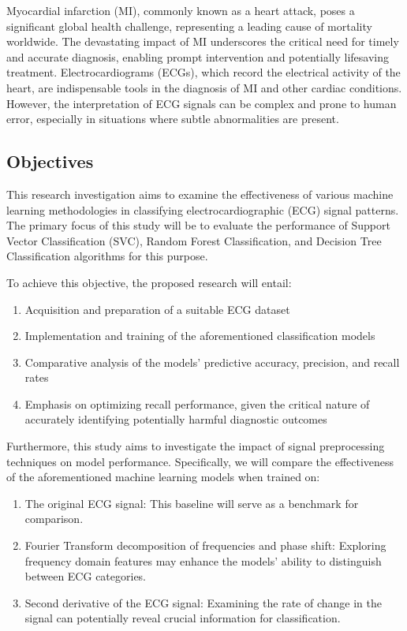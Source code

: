 \documentclass[runningheads]{llncs}
\begin{document}
Myocardial infarction (MI), commonly known as a heart attack, poses a significant global health challenge, representing a leading cause of mortality worldwide. The devastating impact of MI underscores the critical need for timely and accurate diagnosis, enabling prompt intervention and potentially lifesaving treatment. Electrocardiograms (ECGs), which record the electrical activity of the heart, are indispensable tools in the diagnosis of MI and other cardiac conditions. However, the interpretation of ECG signals can be complex and prone to human error, especially in situations where subtle abnormalities are present.


\subsection{Objectives}

This research investigation aims to examine the effectiveness of various machine learning methodologies in classifying electrocardiographic (ECG) signal patterns. The primary focus of this study will be to evaluate the performance of Support Vector Classification (SVC), Random Forest Classification, and Decision Tree Classification algorithms for this purpose.

To achieve this objective, the proposed research will entail:
\begin{enumerate}
    \item Acquisition and preparation of a suitable ECG dataset
    \item Implementation and training of the aforementioned classification models
    \item Comparative analysis of the models' predictive accuracy, precision, and recall rates
    \item Emphasis on optimizing recall performance, given the critical nature of accurately identifying potentially harmful diagnostic outcomes
\end{enumerate}

Furthermore, this study aims to investigate the impact of signal preprocessing techniques on model performance. Specifically, we will compare the effectiveness of the aforementioned machine learning models when trained on:

\begin{enumerate}
    \item The original ECG signal: This baseline will serve as a benchmark for comparison.
    \item Fourier Transform decomposition of frequencies and phase shift: Exploring frequency domain features may enhance the models' ability to distinguish between ECG categories.
    \item Second derivative of the ECG signal: Examining the rate of change in the signal can potentially reveal crucial information for classification.
\end{enumerate}
\end{document}
